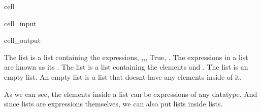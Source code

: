 \documentclass[letterpaper,10pt,english]{jupyterBook}
\begin{document}
\begin{sphinxuseclass}{cell}\begin{sphinxVerbatimInput}

\begin{sphinxuseclass}{cell_input}
\begin{sphinxVerbatim}[commandchars=\\\{\}]
\PYG{p}{[}\PYG{p}{]}
\end{sphinxVerbatim}

\end{sphinxuseclass}\end{sphinxVerbatimInput}
\begin{sphinxVerbatimOutput}

\begin{sphinxuseclass}{cell_output}
\begin{sphinxVerbatim}[commandchars=\\\{\}]
[]
\end{sphinxVerbatim}

\end{sphinxuseclass}\end{sphinxVerbatimOutput}

\end{sphinxuseclass}
\sphinxAtStartPar
The list  is a list containing the expressions, ,,, True, . The expressions in a list are known as its . The list \sphinxcode{\sphinxupquote{{[}5,0{]}}} is a list containing the elements  and . The list \sphinxcode{\sphinxupquote{{[}{]}}} is an empty list. An empty list is a list that doesnt have any elements inside of it.

\sphinxAtStartPar
As we can see, the elements inside a list can be expressions of any datatype. And since lists are expressions themselves, we can also put lists inside lists.
\end{document}
